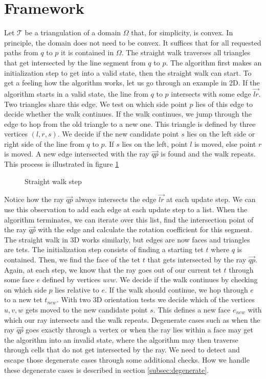 \documentclass[../thesis.tex]{subfiles}
\begin{document}
\section{Framework}
\label{sec:framework}
Let $\mathcal{T}$ be a triangulation of a domain $\Omega$ that, for simplicity, is convex.
In principle, the domain does not need to be convex. It suffices that for all requested paths from $q$ to $p$
it is contained in $\Omega$.
The straight walk traverses all triangles that get intersected by the line segment
from $q$ to $p$. The algorithm first makes an initialization step to get into a valid state, 
then the straight walk can start.
To get a feeling how the algorithm works, let us go through an example in 2D.
If the algorithm starts in a valid state, the line from $q$ to $p$
intersects with some edge $\vec{lr}$. Two triangles share this edge.
We test on which side point $p$ lies of this edge to decide whether the walk continues.
If the walk continues, we jump through the edge to hop from the old triangle to a new one.
This triangle is defined by three vertices $(l,r,s)$. We decide if
the new candidate point $s$ lies on the left side or right side of the line from $q$ to $p$.
If $s$ lies on the left, point $l$ is moved, else point $r$ is moved.
A new edge intersected with the ray $\vec{qp}$ is found and the walk repeats.
This process is illustrated in figure \ref{fig:straight-walk-2d}
\begin{figure}[htb]
  \centering
  \def\svgwidth{35em}
  
  \caption{Straight walk step}\label{fig:straight-walk-2d}        
\end{figure}
Notice how the ray $\vec{qp}$ always intersects the edge $\vec{lr}$ at each update step.
We can use this observation to add each edge at each update step to a list.
When the algorithm terminates, we can iterate over this list, find
the intersection point of the ray $\vec{qp}$ with the edge and calculate the rotation
coefficient for this segment.
The straight walk in 3D works similarly, but edges are now faces and triangles are tets. The initialization step consists of finding a starting tet $t$
where $q$ is contained. Then, we find the face of the tet $t$ that gets intersected by the ray
$\vec{qp}$. Again, at each step, we know that the ray goes out of our current tet $t$ through some
face $e$ defined by vertices $uvw$. We decide if the walk continues by checking on which side $p$ lies relative to $e$.
If the walk should continue, we hop through $e$ to a new tet $t_{new}$. With two 3D orientation tests
we decide which of the vertices $u, v, w$ gets moved to the new candidate point $s$. This defines
a new face $e_{new}$ with which our ray intersects and the walk repeats.
Degenerate cases such as when the ray $\vec{qp}$ goes exactly through a vertex or
when the ray lies within a face may get the algorithm into
an invalid state, where the algorithm may then traverse through
cells that do not get intersected by the ray. We need to detect and escape those degenerate cases
through some additional checks.
How we handle these degenerate cases is described in section \ref{subsec:degenerate}.
\end{document}
